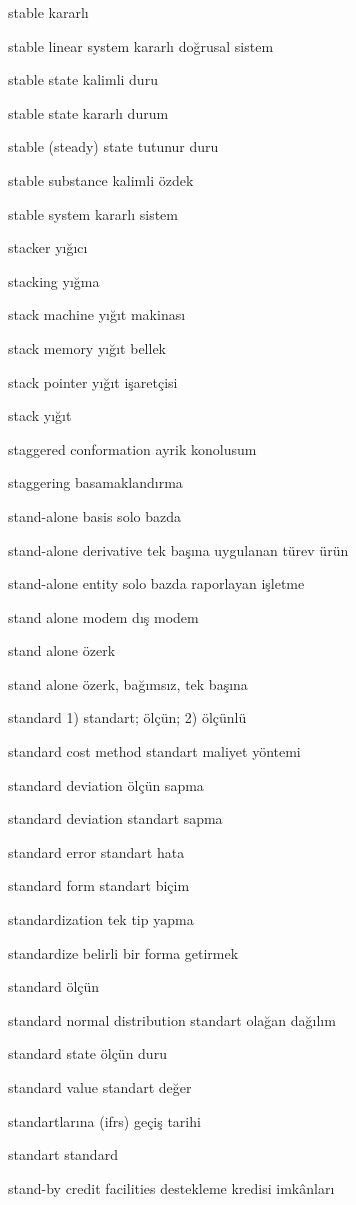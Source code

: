 \documentclass[12pt,fleqn]{article}\usepackage{../../common}
\begin{document}
stable kararlı

stable linear system kararlı doğrusal sistem

stable state kalimli duru

stable state kararlı durum

stable (steady) state tutunur duru

stable substance kalimli özdek

stable system kararlı sistem

stacker yığıcı

stacking yığma

stack machine yığıt makinası

stack memory yığıt bellek

stack pointer yığıt işaretçisi

stack yığıt

staggered conformation ayrik konolusum

staggering basamaklandırma

stand-alone basis solo bazda

stand-alone derivative tek başına uygulanan türev ürün

stand-alone entity solo bazda raporlayan işletme

stand alone modem dış modem

stand alone özerk

stand alone özerk, bağımsız, tek başına

standard 1) standart; ölçün; 2) ölçünlü

standard cost method standart maliyet yöntemi

standard deviation ölçün sapma

standard deviation standart sapma

standard error standart hata

standard form standart biçim

standardization tek tip yapma

standardize belirli bir forma getirmek

standard ölçün

standard normal distribution standart olağan dağılım

standard state ölçün duru

standard value standart değer

standartlarına (ifrs) geçiş tarihi

standart standard

stand-by credit facilities destekleme kredisi imkânları
\end{document}
